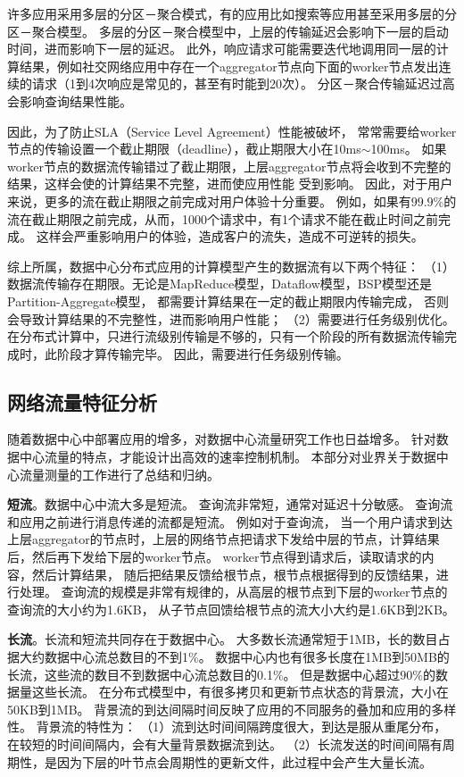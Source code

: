 许多应用采用多层的分区－聚合模式，有的应用比如搜索等应用甚至采用多层的分区－聚合模型。
多层的分区－聚合模型中，上层的传输延迟会影响下一层的启动时间，进而影响下一层的延迟。
此外，响应请求可能需要迭代地调用同一层的计算结果，例如社交网络应用中存在一个aggregator节点向下面的worker节点发出连续的请求（1到4次响应是常见的，甚至有时能到20次）。
分区－聚合传输延迟过高会影响查询结果性能。

因此，为了防止SLA（Service Level Agreement）性能被破坏，
常常需要给worker节点的传输设置一个截止期限（deadline），截止期限大小在10ms$\sim$100ms。
如果worker节点的数据流传输错过了截止期限，上层aggregator节点将会收到不完整的结果，这样会使的计算结果不完整，进而使应用性能
受到影响。
因此，对于用户来说，更多的流在截止期限之前完成对用户体验十分重要。
例如，如果有$99.9\%$的流在截止期限之前完成，从而，1000个请求中，有1个请求不能在截止时间之前完成。
这样会严重影响用户的体验，造成客户的流失，造成不可逆转的损失。

综上所属，数据中心分布式应用的计算模型产生的数据流有以下两个特征：
（1）数据流传输存在期限。无论是MapReduce模型，Dataflow模型，BSP模型还是Partition-Aggregate模型，
都需要计算结果在一定的截止期限内传输完成，
否则会导致计算结果的不完整性，进而影响用户性能；
（2）需要进行任务级别优化。在分布式计算中，只进行流级别传输是不够的，只有一个阶段的所有数据流传输完成时，此阶段才算传输完毕。
因此，需要进行任务级别传输。



\subsection{网络流量特征分析}
随着数据中心中部署应用的增多，对数据中心流量研究工作也日益增多。
针对数据中心流量的特点，才能设计出高效的速率控制机制。
本部分对业界关于数据中心流量测量的工作进行了总结和归纳。

\textbf{短流}。数据中心中流大多是短流\cite{DCTCP}。
查询流非常短，通常对延迟十分敏感。
查询流和应用之前进行消息传递的流都是短流。
例如对于查询流，
当一个用户请求到达上层aggregator的节点时，上层的网络节点把请求下发给中层的节点，计算结果后，然后再下发给下层的worker节点。
worker节点得到请求后，读取请求的内容，然后计算结果，
随后把结果反馈给根节点，根节点根据得到的反馈结果，进行处理。
查询流的规模是非常有规律的，从高层的根节点到下层的worker节点的查询流的大小约为1.6KB，
从子节点回馈给根节点的流大小大约是1.6KB到2KB。



\textbf{长流}。长流和短流共同存在于数据中心。
大多数长流通常短于1MB，长的数目占据大约数据中心流总数目的不到1$\%$。
数据中心内也有很多长度在1MB到50MB的长流，这些流的数目不到数据中心流总数目的0.1$\%$。
但是数据中心超过$90\%$的数据量这些长流。
在分布式模型中，有很多拷贝和更新节点状态的背景流，大小在50KB到1MB。
背景流的到达间隔时间反映了应用的不同服务的叠加和应用的多样性。
背景流的特性为：
（1）流到达时间间隔跨度很大，到达是服从重尾分布，在较短的时间间隔内，会有大量背景数据流到达。
（2）长流发送的时间间隔有周期性，是因为下层的叶节点会周期性的更新文件，此过程中会产生大量长流。


